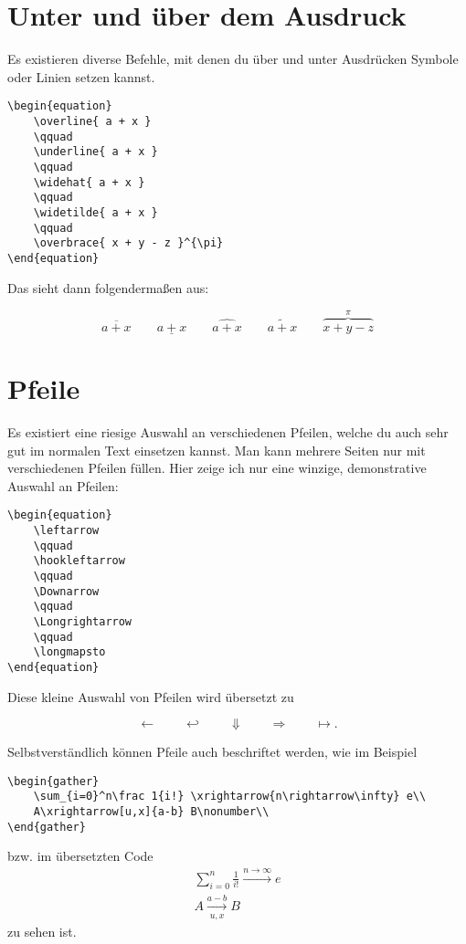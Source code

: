 \section{Unter und über dem Ausdruck}

Es existieren diverse Befehle, mit denen du über und unter Ausdrücken Symbole oder Linien setzen kannst.

\begin{lstlisting}
\begin{equation}
	\overline{ a + x }
	\qquad
	\underline{ a + x }
	\qquad
	\widehat{ a + x }
	\qquad
	\widetilde{ a + x }
	\qquad
	\overbrace{ x + y - z }^{\pi}
\end{equation}
\end{lstlisting} 

Das sieht dann folgendermaßen aus:

\begin{equation}
	\overline{ a + x }
	\qquad
	\underline{ a + x }
	\qquad
	\widehat{ a + x }
	\qquad
	\widetilde{ a + x }
	\qquad
	\overbrace{ x + y - z }^{\pi}
\end{equation}

\section{Pfeile}

Es existiert eine riesige Auswahl an verschiedenen Pfeilen, welche du auch sehr gut im normalen Text einsetzen kannst. Man kann mehrere Seiten nur mit verschiedenen Pfeilen füllen. Hier zeige ich nur eine winzige, demonstrative Auswahl an Pfeilen:

\begin{lstlisting}
\begin{equation}
	\leftarrow
	\qquad
	\hookleftarrow
	\qquad
	\Downarrow
	\qquad
	\Longrightarrow
	\qquad
	\longmapsto
\end{equation}
\end{lstlisting} 

Diese kleine Auswahl von Pfeilen wird übersetzt zu

\begin{equation}
	\leftarrow
	\qquad
	\hookleftarrow
	\qquad
	\Downarrow
	\qquad
	\Longrightarrow
	\qquad
	\longmapsto.
\end{equation}

Selbstverständlich können Pfeile auch beschriftet werden, wie im Beispiel
\begin{lstlisting}
\begin{gather}
	\sum_{i=0}^n\frac 1{i!} \xrightarrow{n\rightarrow\infty} e\\
	A\xrightarrow[u,x]{a-b} B\nonumber\\
\end{gather}
\end{lstlisting}
bzw. im übersetzten Code
\begin{gather}
	\sum_{i=0}^n\frac 1{i!} \xrightarrow{n\rightarrow\infty} e\\
	A\xrightarrow[u,x]{a-b} B\nonumber
\end{gather}
zu sehen ist.

